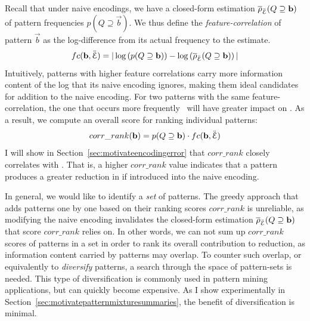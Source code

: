 Recall that under naive encodings, we have a closed-form estimation $\overline \rho_{\ddot{\mathcal E}}(Q \supseteq \mathbf{b})$ of pattern frequencies $p(Q\supseteq\vec b)$.
We thus define the \textit{feature-correlation} of pattern $\vec b$ as the log-difference from its actual frequency to the estimate.
$$fc(\mathbf{b}, \ddot{\mathcal E}) = |\log\left(
    p(Q \supseteq \mathbf{b})
\right) - \log\left(
  \overline \rho_{\ddot{\mathcal E}}(Q \supseteq \mathbf{b})
\right)|$$
Intuitively, patterns with higher feature correlations carry more information content of the log that its naive encoding ignores, making them ideal candidates for addition to the naive encoding.
For two patterns with the same feature-correlation, the one that occurs more frequently~\cite{DBLP:journals/datamine/HanCXY07} will have greater impact on \errorname. 
As a result, we compute an overall score for ranking individual patterns:  
$$corr\_rank(\mathbf{b})=p(Q \supseteq \mathbf{b}) \cdot fc(\mathbf{b}, \ddot{\mathcal E})$$
I will show in Section~\ref{sec:motivateencodingerror} that $corr\_rank$ closely correlates with \errorname.
That is, a higher $corr\_rank$ value indicates that a pattern produces a greater reduction in \errorname if introduced into the naive encoding.

In general, we would like to identify a \emph{set} of patterns.
The greedy approach that adds patterns one by one based on their ranking scores $corr\_rank$ is unreliable, as modifying the naive encoding invalidates the closed-form estimation $\overline \rho_{\ddot{\mathcal E}}(Q \supseteq \mathbf{b})$ that score $corr\_rank$ relies on.
In other words, we can not sum up $corr\_rank$ scores of patterns in a set in order to rank its overall contribution to \errorname reduction, as information content carried by patterns may overlap.
To counter such overlap, or equivalently to \textit{diversify} patterns, a search through the space of pattern-sets is needed.
This type of diversification is commonly used in pattern mining applications, but can quickly become expensive.
As I show experimentally in Section~\ref{sec:motivatepatternmixturesummaries}, the benefit of diversification is minimal.



